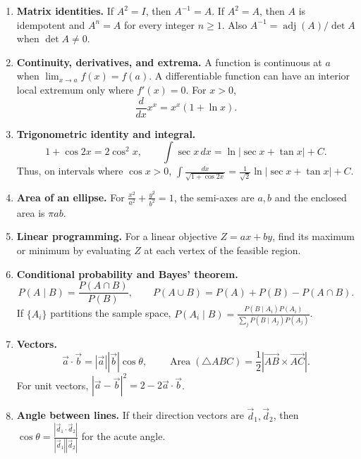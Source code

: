 \begin{enumerate}[label=\textbf{1.1.\arabic*.},ref=1.1.\arabic*]
\setlength{\itemsep}{0.35em}
\item \label{formula-1-1-1} \textbf{Matrix identities.} If $A^2=I$, then $A^{-1}=A$. If $A^2=A$, then $A$ is idempotent and $A^n=A$ for every integer $n\ge1$. Also $A^{-1}=\operatorname{adj}(A)/\det A$ when $\det A\ne0$.
\item \label{formula-1-1-2} \textbf{Continuity, derivatives, and extrema.} A function is continuous at $a$ when $\lim_{x\to a}f(x)=f(a)$. A differentiable function can have an interior local extremum only where $f'(x)=0$. For $x>0$,
\begin{equation*}\tag{1.1.2.1}
\frac{d}{dx}x^x=x^x(1+\ln x).
\end{equation*}
\item \label{formula-1-1-3} \textbf{Trigonometric identity and integral.}
\begin{equation*}\tag{1.1.3.1}
1+\cos2x=2\cos^2x,\qquad
\int\sec x\,dx=\ln|\sec x+\tan x|+C.
\end{equation*}
Thus, on intervals where $\cos x>0$, $\int\frac{dx}{\sqrt{1+\cos2x}}=\frac1{\sqrt2}\ln|\sec x+\tan x|+C$.
\item \label{formula-1-1-4} \textbf{Area of an ellipse.} For $\frac{x^2}{a^2}+\frac{y^2}{b^2}=1$, the semi-axes are $a,b$ and the enclosed area is $\pi ab$.
\item \label{formula-1-1-5} \textbf{Linear programming.} For a linear objective $Z=ax+by$, find its maximum or minimum by evaluating $Z$ at each vertex of the feasible region.
\item \label{formula-1-1-6} \textbf{Conditional probability and Bayes' theorem.}
\begin{equation*}\tag{1.1.6.1}
P(A\mid B)=\frac{P(A\cap B)}{P(B)},\qquad
P(A\cup B)=P(A)+P(B)-P(A\cap B).
\end{equation*}
If $\{A_i\}$ partitions the sample space, $P(A_i\mid B)=\frac{P(B\mid A_i)P(A_i)}{\sum_jP(B\mid A_j)P(A_j)}$.
\item \label{formula-1-1-7} \textbf{Vectors.}
\begin{equation*}\tag{1.1.7.1}
\vec a\cdot\vec b=|\vec a||\vec b|\cos\theta,\qquad
\operatorname{Area}(\triangle ABC)=\frac12|\overrightarrow{AB}\times\overrightarrow{AC}|.
\end{equation*}
For unit vectors, $|\vec a-\vec b|^2=2-2\vec a\cdot\vec b$.
\item \label{formula-1-1-8} \textbf{Angle between lines.} If their direction vectors are $\vec d_1,\vec d_2$, then $\cos\theta=\frac{|\vec d_1\cdot\vec d_2|}{|\vec d_1||\vec d_2|}$ for the acute angle.

\end{enumerate}
